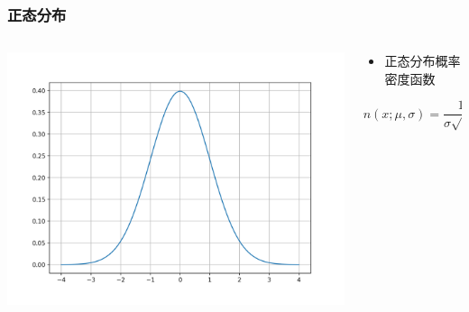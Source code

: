 \documentclass[serif,aspectratio=169]{beamer}
\begin{document}
\begin{frame}
  \frametitle{正态分布}
  \begin{columns}
    \begin{column}{.5\textwidth}
      \centering
      \includegraphics[width=.9\textwidth]{img/normal.png}
    \end{column}

    \begin{column}{.5\textwidth}
      \begin{itemize}
      \item 正态分布概率密度函数
      \end{itemize}
      $$n(x;\mu,\sigma)=\frac{1}{\sigma\sqrt{2\pi}}e^{-\frac{1}{2}\left(\frac{x-\mu}{\sigma}\right)^2}\quad x\in(-\infty,\,\infty)$$
    \end{column}
  \end{columns}
\end{frame}
\end{document}
